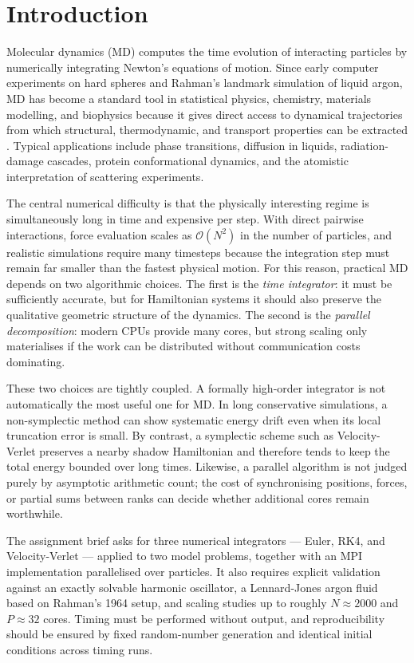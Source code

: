 \documentclass[10pt,twocolumn]{article}
\begin{document}
\section{Introduction}

Molecular dynamics (MD) computes the time evolution of interacting particles by numerically integrating Newton's equations of motion. Since early computer experiments on hard spheres and Rahman's landmark simulation of liquid argon, MD has become a standard tool in statistical physics, chemistry, materials modelling, and biophysics because it gives direct access to dynamical trajectories from which structural, thermodynamic, and transport properties can be extracted \citep{AlderWainwright1957,Rahman1964,FrenkelSmit2002,AllenTildesley2017}. Typical applications include phase transitions, diffusion in liquids, radiation-damage cascades, protein conformational dynamics, and the atomistic interpretation of scattering experiments.

The central numerical difficulty is that the physically interesting regime is simultaneously long in time and expensive per step. With direct pairwise interactions, force evaluation scales as $\mathcal{O}(N^2)$ in the number of particles, and realistic simulations require many timesteps because the integration step must remain far smaller than the fastest physical motion. For this reason, practical MD depends on two algorithmic choices. The first is the \emph{time integrator}: it must be sufficiently accurate, but for Hamiltonian systems it should also preserve the qualitative geometric structure of the dynamics. The second is the \emph{parallel decomposition}: modern CPUs provide many cores, but strong scaling only materialises if the work can be distributed without communication costs dominating.

These two choices are tightly coupled. A formally high-order integrator is not automatically the most useful one for MD. In long conservative simulations, a non-symplectic method can show systematic energy drift even when its local truncation error is small. By contrast, a symplectic scheme such as Velocity-Verlet preserves a nearby shadow Hamiltonian and therefore tends to keep the total energy bounded over long times. Likewise, a parallel algorithm is not judged purely by asymptotic arithmetic count; the cost of synchronising positions, forces, or partial sums between ranks can decide whether additional cores remain worthwhile.

The assignment brief asks for three numerical integrators --- Euler, RK4, and Velocity-Verlet --- applied to two model problems, together with an MPI implementation parallelised over particles. It also requires explicit validation against an exactly solvable harmonic oscillator, a Lennard-Jones argon fluid based on Rahman's 1964 setup, and scaling studies up to roughly $N\approx 2000$ and $P\approx 32$ cores. Timing must be performed without output, and reproducibility should be ensured by fixed random-number generation and identical initial conditions across timing runs.
\end{document}
